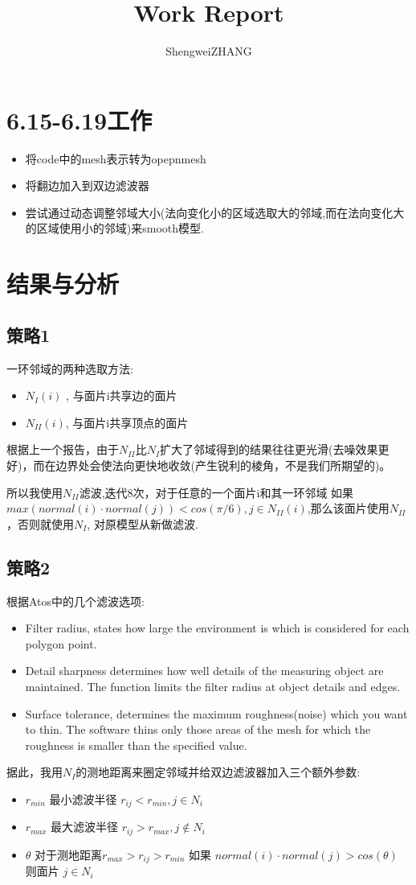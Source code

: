 \documentclass{article}
\title{Work Report}
\author{ShengweiZHANG\\
}
\theoremstyle{definition}
\theoremstyle{remark}
\begin{document}
\maketitle

\section{6.15-6.19工作}
\begin{itemize}
	\item 将code中的mesh表示转为opepnmesh
        \item 将翻边加入到双边滤波器
	\item 尝试通过动态调整邻域大小(法向变化小的区域选取大的邻域,而在法向变化大的区域使用小的邻域)来smooth模型.
\end{itemize}
\section{结果与分析}
\subsection{策略1}
一环邻域的两种选取方法:
\begin{itemize}
  \item $N_I(i)$ , 与面片i共享边的面片
  \item $N_{II}(i)$, 与面片i共享顶点的面片
\end{itemize}
根据上一个报告，由于$N_{II}$比$N_{I}$扩大了邻域得到的结果往往更光滑(去噪效果更好)，而在边界处会使法向更快地收敛(产生锐利的棱角，不是我们所期望的)。\par
所以我使用$N_{II}$滤波,迭代8次，对于任意的一个面片i和其一环邻域 如果$max(normal(i) \cdot normal(j)) < cos(\pi/6), j \in N_{II}(i)$,那么该面片使用$N_{II}$，否则就使用$N_I$, 对原模型从新做滤波.
\subsection{策略2}
根据Atos中的几个滤波选项:
\begin{itemize}
  \item  Filter radius, states how large the environment is which is considered for each polygon point.
  \item Detail sharpness determines how well details of the measuring object are maintained. The function limits the filter radius at object details and edges.
  \item Surface tolerance, determines the maximum roughness(noise) which you want to thin. The software thins only those areas of the mesh for which the roughness is smaller than the specified value.
\end{itemize}
据此，我用$N_I$的测地距离来圈定邻域并给双边滤波器加入三个额外参数:
\begin{itemize}
  \item $r_{min}$ 最小滤波半径 $r_{ij} < r_{min}, j\in N_{i}$ 
  \item ${r_{max}}$ 最大滤波半径 $r_{ij} > r_{max}, j \notin N_{i}$ 
  \item $\theta$  对于测地距离$r_{max}>r_{ij} >r_{min}$ 如果 $normal(i) \cdot normal(j) > cos(\theta)$ 则面片 $j\in N_{i}$
 \end{itemize}
\end{document}
